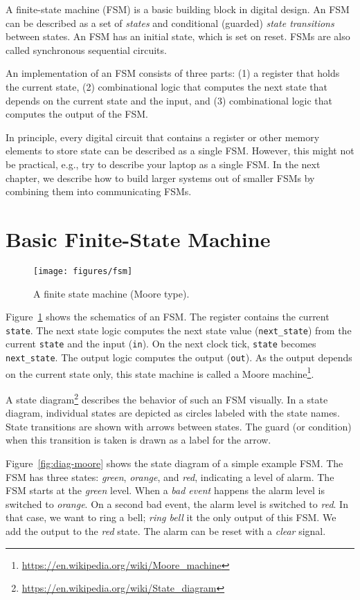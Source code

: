 \documentclass[%
    10pt,
    headinclude, footexclude,
    openright, %
    notitlepage,
    cleardoubleempty,
    headsepline,
    pointlessnumbers,
    bibtotoc, idxtotoc,
    ]{scrbook}
\newcommand{\code}[1]{{\small{\texttt{#1}}}}
\newcommand{\scale}{0.7}
\newcommand{\myref}[2]{\href{#1}{#2}}
\renewcommand{\myref}[2]{{#2}{\footnote{\url{#1}}}}
\begin{document}
A finite-state machine (FSM) is a basic building block in digital design.
An FSM can be described as a set of \emph{states} and conditional (guarded)
\emph{state transitions} between states. 
An FSM has an initial state, which is set on reset.
FSMs are also called synchronous sequential circuits.

An implementation of an FSM consists of three parts: (1) a register that holds the current state,
(2) combinational logic that computes the next state that depends on the current
state and the input, and (3) combinational logic that computes the output of the FSM.

In principle, every digital circuit that contains a register or other memory elements
to store state can be described as a single FSM. However, this might
not be practical, e.g., try to describe your laptop as a single FSM.
In the next chapter, we describe how to build larger systems
out of smaller FSMs by combining them into communicating FSMs.

\section{Basic Finite-State Machine}

\begin{figure}
  \centering
  \texttt{[image: figures/fsm]}
  \caption{A finite state machine (Moore type).}
  \label{fig:fsm}
\end{figure}

Figure~\ref{fig:fsm} shows the schematics of an FSM. The register contains the current \code{state}.
The next state logic computes the next state value (\code{next\_state})
from the current \code{state} and the input (\code{in}).
On the next clock tick, \code{state} becomes \code{next\_state}.
The output logic computes the output (\code{out}). As the output depends on the current
state only, this state machine is called a
\myref{https://en.wikipedia.org/wiki/Moore_machine}{Moore machine}.

A \myref{https://en.wikipedia.org/wiki/State_diagram}{state diagram}
describes the behavior of such an FSM visually.
In a state diagram, individual states are depicted as circles labeled
with the state names.
State transitions are shown with arrows between states.
The guard (or condition) when this transition is taken is drawn as a label
for the arrow.

Figure~\ref{fig:diag-moore} shows the state diagram of a simple example FSM.
The FSM has three states: \emph{green}, \emph{orange}, and \emph{red},
indicating a level of alarm. The FSM starts at the \emph{green} level.
When a \emph{bad event} happens the alarm level is switched to \emph{orange}.
On a second bad event, the alarm level is switched to \emph{red}.
In that case, we want to ring a bell; \emph{ring bell} it the only output of this FSM.
We add the output to the \emph{red} state.
The alarm can be reset with a \emph{clear} signal.
\end{document}
